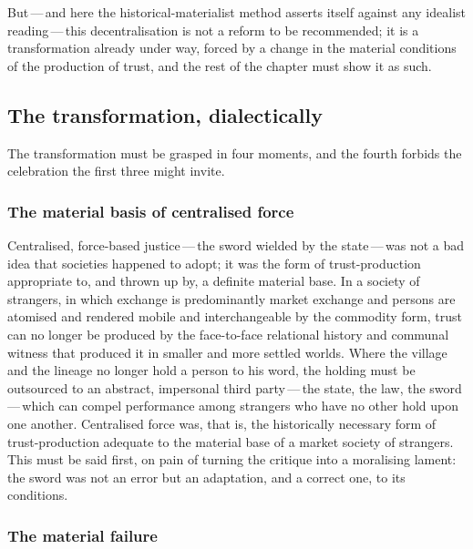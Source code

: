 But\,---\,and here the historical-materialist method asserts itself against any idealist reading\,---\,this decentralisation is not a reform to be recommended; it is a transformation already under way, forced by a change in the material conditions of the production of trust, and the rest of the chapter must show it as such.

\subsection{The transformation, dialectically}
\label{p13:sub:jud-dialectic}

The transformation must be grasped in four moments, and the fourth forbids the celebration the first three might invite.

\subsubsection{The material basis of centralised force}
\label{p13:sub:jud-thesis}

Centralised, force-based justice\,---\,the sword wielded by the state\,---\,was not a bad idea that societies happened to adopt; it was the form of trust-production appropriate to, and thrown up by, a definite material base. In a society of strangers, in which exchange is predominantly market exchange and persons are atomised and rendered mobile and interchangeable by the commodity form, trust can no longer be produced by the face-to-face relational history and communal witness that produced it in smaller and more settled worlds. Where the village and the lineage no longer hold a person to his word, the holding must be outsourced to an abstract, impersonal third party\,---\,the state, the law, the sword\,---\,which can compel performance among strangers who have no other hold upon one another. Centralised force was, that is, the historically necessary form of trust-production adequate to the material base of a market society of strangers. This must be said first, on pain of turning the critique into a moralising lament: the sword was not an error but an adaptation, and a correct one, to its conditions.

\subsubsection{The material failure}
\label{p13:sub:jud-antithesis}

